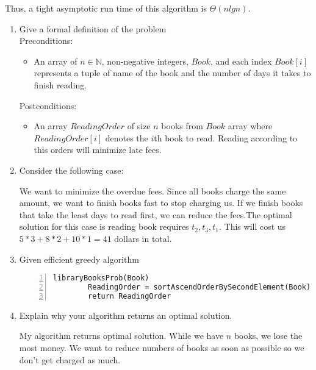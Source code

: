 \documentclass{cpsc413Solutions}
\begin{document}
\begin{problemlist}
\begin{problem}
\begin{answer}
\begin{enumerate}
    Thus, a tight asymptotic run time of this algorithm is $\Theta(nlgn)$.
    
\end{enumerate}

\end{answer}
\end{problem}


\begin{problem} 
\begin{answer}
\begin{enumerate}
    \item Give a formal definition of the problem\\
    Preconditions:
    \begin{itemize}
        \item An array of $n\in\mathbb{N}$, non-negative integers, $Book$, and each index $Book[i]$ represents a tuple of name of the book and the number of days it takes to finish reading.
    \end{itemize}
    Postconditions:
    \begin{itemize}
        \item An array $ReadingOrder$ of size $n$ books from $Book $ array where $ReadingOrder[i]$ denotes the $i$th book to read. Reading according to this orders will minimize late fees.
    \end{itemize}
    
    \item Consider the following case:
    
    We want to minimize the overdue fees. Since all books charge the same amount, we want to finish books fast to stop charging us. If we finish books that take the least days to read first, we can reduce the fees.The optimal solution for this case is reading book requires $t_2, t_3, t_1$. This will cost us $5*3+8*2+10*1=41$ dollars in total.
    
    \item Given efficient greedy algorithm
    \begin{lstlisting}[numbers=left]
    libraryBooksProb(Book)
        ReadingOrder = sortAscendOrderBySecondElement(Book)
        return ReadingOrder
    \end{lstlisting}
    
    \item Explain why your algorithm returns an optimal solution.
    
    My algorithm returns optimal solution. While we have $n$ books, we lose the most money. We want to reduce numbers of books as soon as possible so we don't get charged as much. 
    

\end{enumerate}
\end{answer}
\end{problem}
\end{problemlist}
\end{document}
